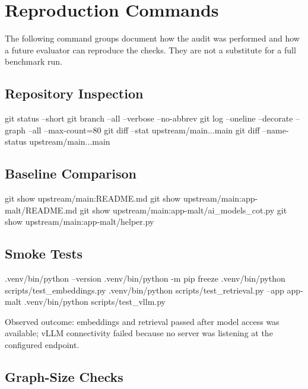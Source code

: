 \documentclass[11pt,a4paper]{article}
\begin{document}
\section{Reproduction Commands}

The following command groups document how the audit was performed and how a future evaluator can reproduce the checks. They are not a substitute for a full benchmark run.

\subsection{Repository Inspection}

\begin{commandbox}
git status --short
git branch --all --verbose --no-abbrev
git log --oneline --decorate --graph --all --max-count=80
git diff --stat upstream/main...main
git diff --name-status upstream/main...main
\end{commandbox}

\subsection{Baseline Comparison}

\begin{commandbox}
git show upstream/main:README.md
git show upstream/main:app-malt/README.md
git show upstream/main:app-malt/ai_models_cot.py
git show upstream/main:app-malt/helper.py
\end{commandbox}

\subsection{Smoke Tests}

\begin{commandbox}
.venv/bin/python --version
.venv/bin/python -m pip freeze
.venv/bin/python scripts/test_embeddings.py
.venv/bin/python scripts/test_retrieval.py --app app-malt
.venv/bin/python scripts/test_vllm.py
\end{commandbox}

Observed outcome: embeddings and retrieval passed after model access was available; vLLM connectivity failed because no server was listening at the configured endpoint.

\subsection{Graph-Size Checks}
\end{document}

